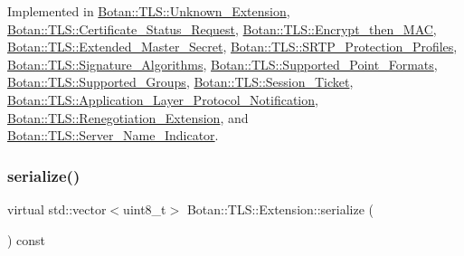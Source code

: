 Implemented in \hyperlink{class_botan_1_1_t_l_s_1_1_unknown___extension_a0b2f674ad0a239c57c20eda9caf60783}{Botan\+::\+T\+L\+S\+::\+Unknown\+\_\+\+Extension}, \hyperlink{class_botan_1_1_t_l_s_1_1_certificate___status___request_ae4224e1787859f27cbba86a038e1fc78}{Botan\+::\+T\+L\+S\+::\+Certificate\+\_\+\+Status\+\_\+\+Request}, \hyperlink{class_botan_1_1_t_l_s_1_1_encrypt__then___m_a_c_af8412e160e798f87de854889a66faec5}{Botan\+::\+T\+L\+S\+::\+Encrypt\+\_\+then\+\_\+\+M\+AC}, \hyperlink{class_botan_1_1_t_l_s_1_1_extended___master___secret_ab7445933ce793c95ef1576bf35d1154c}{Botan\+::\+T\+L\+S\+::\+Extended\+\_\+\+Master\+\_\+\+Secret}, \hyperlink{class_botan_1_1_t_l_s_1_1_s_r_t_p___protection___profiles_a4b6f1e03445601ca122e036c03e1dcbb}{Botan\+::\+T\+L\+S\+::\+S\+R\+T\+P\+\_\+\+Protection\+\_\+\+Profiles}, \hyperlink{class_botan_1_1_t_l_s_1_1_signature___algorithms_a7216e44527a194bebce7d616d6d3fe62}{Botan\+::\+T\+L\+S\+::\+Signature\+\_\+\+Algorithms}, \hyperlink{class_botan_1_1_t_l_s_1_1_supported___point___formats_a66014f1fe0e75931f0c7a682aa9d9083}{Botan\+::\+T\+L\+S\+::\+Supported\+\_\+\+Point\+\_\+\+Formats}, \hyperlink{class_botan_1_1_t_l_s_1_1_supported___groups_a00ea6c535e6d7198cf6b74c1fb4fe71a}{Botan\+::\+T\+L\+S\+::\+Supported\+\_\+\+Groups}, \hyperlink{class_botan_1_1_t_l_s_1_1_session___ticket_a6796d47c184b69f1eaf5bcee582a4ebe}{Botan\+::\+T\+L\+S\+::\+Session\+\_\+\+Ticket}, \hyperlink{class_botan_1_1_t_l_s_1_1_application___layer___protocol___notification_ab6232ae6d76319a276b698c9cf69d510}{Botan\+::\+T\+L\+S\+::\+Application\+\_\+\+Layer\+\_\+\+Protocol\+\_\+\+Notification}, \hyperlink{class_botan_1_1_t_l_s_1_1_renegotiation___extension_a3e8751e4089301b3d9b39e7e2028573e}{Botan\+::\+T\+L\+S\+::\+Renegotiation\+\_\+\+Extension}, and \hyperlink{class_botan_1_1_t_l_s_1_1_server___name___indicator_a24967daf77707733edc72619984bfb8a}{Botan\+::\+T\+L\+S\+::\+Server\+\_\+\+Name\+\_\+\+Indicator}.

\mbox{\label{class_botan_1_1_t_l_s_1_1_extension_a56788726ad2526db54e5a26039cb69db}} 
\subsubsection{\texorpdfstring{serialize()}{serialize()}}
{\footnotesize\ttfamily virtual std\+::vector$<$uint8\+\_\+t$>$ Botan\+::\+T\+L\+S\+::\+Extension\+::serialize (\begin{DoxyParamCaption}{ }\end{DoxyParamCaption}) const\hspace{0.3cm}{\ttfamily [pure virtual]}}

